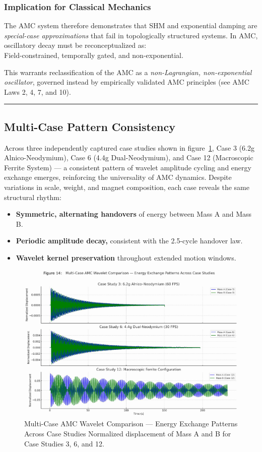 \documentclass[10pt,aps,pre,onecolumn,superscriptaddress,notitlepage]{revtex4-2}
\begin{document}
\hrulefill

\noindent
\subsubsection{Implication for Classical Mechanics}

\medskip
\noindent
The AMC system therefore demonstrates that SHM and exponential damping are \textit{special-case approximations} that fail in topologically structured systems. In AMC, oscillatory decay must be reconceptualized as: \\
Field-constrained, temporally gated, and non-exponential.

\medskip
\noindent
This warrants reclassification of the AMC as a \textit{non-Lagrangian, non-exponential oscillator}, governed instead by empirically validated AMC principles (see AMC Laws 2, 4, 7, and 10).
\vspace{1em}
\hrule
\vspace{0.2em}
\clearpage
\subsection{Multi-Case Pattern Consistency}
\label{sec:Multi-CasePatternConsistency}
Across three independently captured case studies shown in figure~\ref{fig:Multi-CaseAMC}, Case 3 (6.2g Alnico-Neodymium), Case 6 (4.4g Dual-Neodymium), and Case 12 (Macroscopic Ferrite System) — a consistent pattern of wavelet amplitude cycling and energy exchange emerges, reinforcing the universality of AMC dynamics. Despite variations in scale, weight, and magnet composition, each case reveals the same structural rhythm:
\begin{itemize}
    \item \textbf{Symmetric, alternating handovers}
     of energy between Mass A and Mass B.
    \item \textbf{Periodic amplitude decay,} consistent with the 2.5-cycle handover law.
    \item \textbf{Wavelet kernel preservation} throughout extended motion windows.
\end{itemize}
\begin{figure}[htbp]
  \centering
  \includegraphics[width=0.8\linewidth]{figures/Figure 14 Case Study 3, 6 and 12 Wavelet Pattern.jpg}
  \caption{Multi-Case AMC Wavelet Comparison — Energy Exchange Patterns Across Case Studies
 Normalized displacement of Mass A and B for Case Studies 3, 6, and 12. }
  \label{fig:Multi-CaseAMC}
\end{figure}
\end{document}
